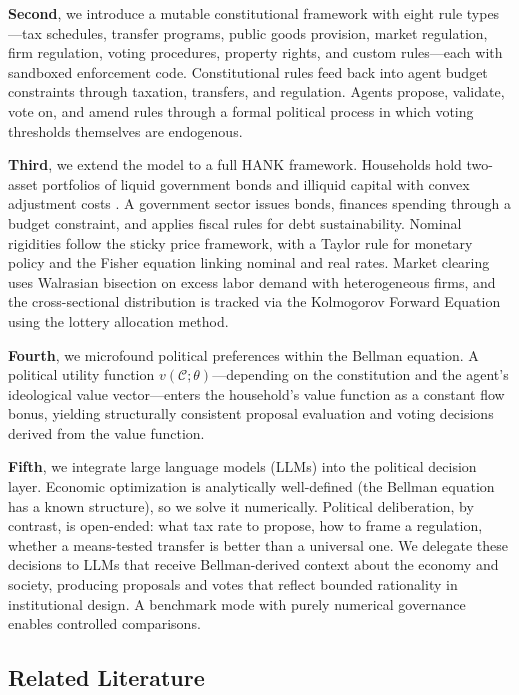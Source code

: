 \documentclass[12pt]{article}
\newcommand{\calC}{\mathcal{C}}
\begin{document}
\textbf{Second}, we introduce a mutable constitutional framework with eight rule types---tax schedules, transfer programs, public goods provision, market regulation, firm regulation, voting procedures, property rights, and custom rules---each with sandboxed enforcement code. Constitutional rules feed back into agent budget constraints through taxation, transfers, and regulation. Agents propose, validate, vote on, and amend rules through a formal political process in which voting thresholds themselves are endogenous.

\textbf{Third}, we extend the model to a full HANK framework. Households hold two-asset portfolios of liquid government bonds and illiquid capital with convex adjustment costs \citep{kaplanmollviolante2018}. A government sector issues bonds, finances spending through a budget constraint, and applies fiscal rules for debt sustainability. Nominal rigidities follow the \citet{rotemberg1982} sticky price framework, with a Taylor rule for monetary policy and the Fisher equation linking nominal and real rates. Market clearing uses Walrasian bisection on excess labor demand with heterogeneous firms, and the cross-sectional distribution is tracked via the Kolmogorov Forward Equation using the \citet{young2010} lottery allocation method.

\textbf{Fourth}, we microfound political preferences within the Bellman equation. A political utility function $v(\calC; \theta)$---depending on the constitution and the agent's ideological value vector---enters the household's value function as a constant flow bonus, yielding structurally consistent proposal evaluation and voting decisions derived from the value function.

\textbf{Fifth}, we integrate large language models (LLMs) into the political decision layer. Economic optimization is analytically well-defined (the Bellman equation has a known structure), so we solve it numerically. Political deliberation, by contrast, is open-ended: what tax rate to propose, how to frame a regulation, whether a means-tested transfer is better than a universal one. We delegate these decisions to LLMs that receive Bellman-derived context about the economy and society, producing proposals and votes that reflect bounded rationality in institutional design. A benchmark mode with purely numerical governance enables controlled comparisons.

\subsection{Related Literature}
\end{document}
